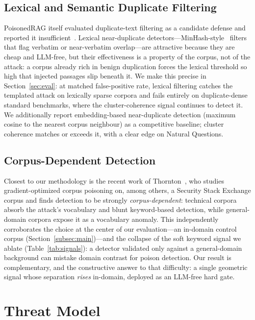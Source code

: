 \documentclass[10pt,journal,compsoc]{IEEEtran}
\begin{document}
\subsection{Lexical and Semantic Duplicate Filtering}
PoisonedRAG itself evaluated duplicate-text filtering as a candidate defense and
reported it insufficient~\cite{poisonedrag}. Lexical near-duplicate
detectors---MinHash-style~\cite{minhash} filters that
flag verbatim or near-verbatim overlap---are attractive because they are cheap and
LLM-free, but their effectiveness is
a property of the corpus, not of the attack: a corpus already rich in benign
duplication forces the lexical threshold so high that injected passages slip
beneath it. We make this precise in Section~\ref{sec:eval}: at matched
false-positive rate, lexical filtering catches the templated attack on lexically
sparse corpora and fails entirely on duplicate-dense standard benchmarks, where
the cluster-coherence signal continues to detect it.
We additionally report embedding-based near-duplicate detection (maximum cosine
to the nearest corpus neighbour) as a competitive baseline; cluster coherence
matches or exceeds it, with a clear edge on Natural Questions.

\subsection{Corpus-Dependent Detection}
Closest to our methodology is the recent work of Thornton~\cite{thornton2026},
who studies gradient-optimized corpus poisoning on, among others, a Security Stack
Exchange corpus and finds detection to be strongly \emph{corpus-dependent}:
technical corpora absorb the attack's vocabulary and blunt keyword-based
detection, while general-domain corpora expose it as a vocabulary anomaly. This
independently corroborates the choice at the center of our evaluation---an
in-domain control corpus (Section~\ref{subsec:main})---and the collapse of the
soft keyword signal we ablate (Table~\ref{tab:signals}): a detector validated only
against a general-domain background can mistake domain contrast for poison
detection. Our result is complementary, and the constructive answer to that
difficulty: a single geometric signal whose separation \emph{rises} in-domain,
deployed as an LLM-free hard gate.

\section{Threat Model}
\label{sec:threat}
\end{document}
